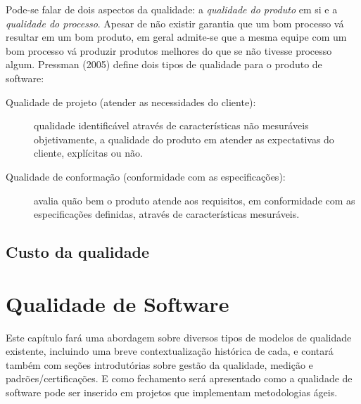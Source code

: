 \documentclass[
	12pt,				%
	openright,			%
	twoside,			%
	a4paper,			%
	english,			%
	brazil,				%
	]{abntex2}
\begin{document}

Pode-se falar de dois aspectos da qualidade: a \emph{qualidade do produto} em si e a \emph{qualidade do processo}. Apesar de não existir garantia que um bom processo vá resultar em um bom produto, em geral admite-se que a mesma equipe com um bom processo vá produzir produtos melhores do que se não tivesse processo algum. Pressman (2005) define dois tipos de qualidade para o produto de software: %

\begin{description}
    \item [Qualidade de projeto (atender as necessidades do cliente):] qualidade identificável através de características não mesuráveis objetivamente, a qualidade do produto em atender as expectativas do cliente, explícitas ou não.
    \item [Qualidade de conformação (conformidade com as especificações):] avalia quão bem o produto atende aos requisitos, em conformidade com as especificações definidas, através de características mesuráveis.
\end{description}

\section{Custo da qualidade}


\chapter{Qualidade de Software}
Este capítulo fará uma abordagem sobre diversos tipos de modelos de qualidade existente, incluindo uma breve contextualização histórica de cada, e contará também com seções introdutórias sobre gestão da qualidade, medição e padrões/certificações. E como fechamento será apresentado como a qualidade de software pode ser inserido em projetos que implementam metodologias ágeis.
\end{document}
